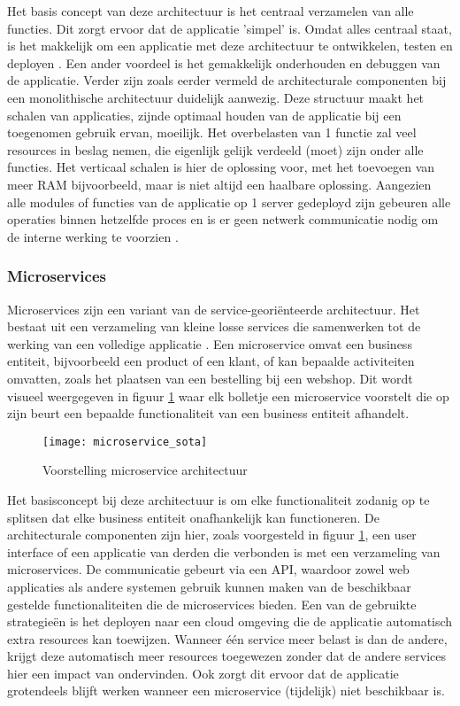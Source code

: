 Het basis concept van deze architectuur is het centraal verzamelen van alle functies. Dit zorgt ervoor dat de applicatie 'simpel' is. Omdat alles centraal staat, is het makkelijk om een applicatie met deze architectuur te ontwikkelen, testen en deployen \autocite{Hou2023}. Een ander voordeel is het gemakkelijk onderhouden en debuggen van de applicatie. Verder zijn zoals eerder vermeld de architecturale componenten bij een monolithische architectuur duidelijk aanwezig. Deze structuur maakt het schalen van applicaties, zijnde optimaal houden van de applicatie bij een toegenomen gebruik ervan, moeilijk. Het overbelasten van 1 functie zal veel resources in beslag nemen, die eigenlijk gelijk verdeeld (moet) zijn onder alle functies. Het verticaal schalen is hier de oplossing voor, met het toevoegen van meer RAM bijvoorbeeld, maar is niet altijd een haalbare oplossing. Aangezien alle modules of functies van de applicatie op 1 server gedeployd zijn gebeuren alle operaties binnen hetzelfde proces en is er geen netwerk communicatie nodig om de interne werking te voorzien \autocite{Ozkaya2023}. 


\subsubsection{Microservices}
Microservices zijn een variant van de service-georiënteerde architectuur. Het bestaat uit een verzameling van kleine losse services die samenwerken tot de werking van een volledige applicatie \autocite{Megargel2020}. Een microservice omvat een business entiteit, bijvoorbeeld een product of een klant, of kan bepaalde activiteiten omvatten, zoals het plaatsen van een bestelling bij een webshop. Dit wordt visueel weergegeven in figuur \ref{microservice_sota} waar elk bolletje een microservice voorstelt die op zijn beurt een bepaalde functionaliteit van een business entiteit afhandelt.\\

\begin{figure}[H]
    \texttt{[image: microservice\_sota]}
    \caption{Voorstelling microservice architectuur \autocite{Megargel2020}}
    \label{microservice_sota}
\end{figure}

Het basisconcept bij deze architectuur is om elke functionaliteit zodanig op te splitsen dat elke business entiteit onafhankelijk kan functioneren. De architecturale componenten zijn hier, zoals voorgesteld in figuur \ref{microservice_sota}, een user interface of een applicatie van derden die verbonden is met een verzameling van microservices. De communicatie gebeurt via een API, waardoor zowel web applicaties als andere systemen gebruik kunnen maken van de beschikbaar gestelde functionaliteiten die de microservices bieden. Een van de gebruikte strategieën is het deployen naar een cloud omgeving die de applicatie automatisch extra resources kan toewijzen. Wanneer één service meer belast is dan de andere, krijgt deze automatisch meer resources toegewezen zonder dat de andere services hier een impact van ondervinden. Ook zorgt dit ervoor dat de applicatie grotendeels blijft werken wanneer een microservice (tijdelijk) niet beschikbaar is.

